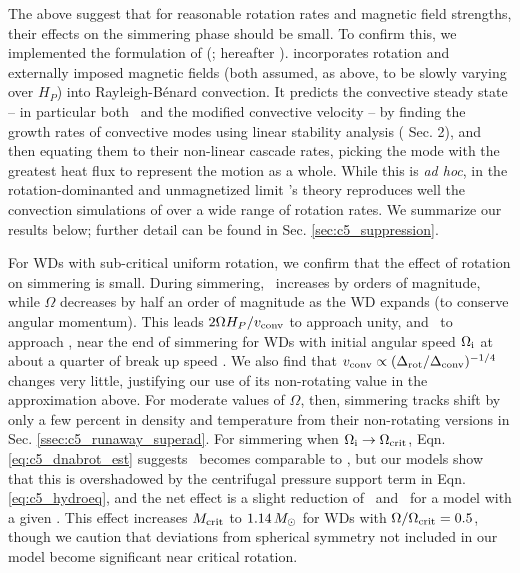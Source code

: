 The above suggest that for reasonable rotation rates and magnetic field strengths, their effects on the simmering phase should be small.  To confirm this, we implemented the formulation of \citeauthor{stev79} (\citeyear{stev79}; hereafter \citeal{stev79}).  \citeal{stev79} incorporates rotation and externally imposed magnetic fields (both assumed, as above, to be slowly varying over $H_P$) into Rayleigh-B\'{e}nard convection.  It predicts the convective steady state -- in particular both \deltanab\ and the modified convective velocity -- by finding the growth rates of convective modes using linear stability analysis (\citeal{stev79} Sec. 2), and then equating them to their non-linear cascade rates, picking the mode with the greatest heat flux to represent the motion as a whole.  While this is \textit{ad hoc}, in the rotation-dominanted and unmagnetized limit \citeal{stev79}'s theory reproduces well the convection simulations of \cite{barkdl14} over a wide range of rotation rates.  We summarize our results below; further detail can be found in Sec. \ref{sec:c5_suppression}.

For WDs with sub-critical uniform rotation, we confirm that the effect of rotation on simmering is small.  During simmering, \vconv\ increases by orders of magnitude, while $\Omega$ decreases by half an order of magnitude as the WD expands (to conserve angular momentum).  This leads $2\Omega H_P/\vconv$ to approach unity, and \dnabrot\ to approach \dnabconv, near the end of simmering for WDs with initial angular speed $\Ominit$ at about a quarter of break up speed \Omcrit.  We also find that $\vconv \propto (\dnabrot/\dnabconv)^{-1/4}$ changes very little, justifying our use of its non-rotating value in the approximation above. For moderate values of $\Omega$, then, simmering tracks shift by only a few percent in density and temperature from their non-rotating versions in Sec. \ref{ssec:c5_runaway_superad}.  For simmering when $\Ominit \rightarrow \Omcrit$, Eqn. \ref{eq:c5_dnabrot_est} suggests \dnabrot\ becomes comparable to \nablaad, but our models show that this is overshadowed by the centrifugal pressure support term in Eqn. \ref{eq:c5_hydroeq}, and the net effect is a slight reduction of \rhoc\ and \Tc\ for a model with a given \Sc.  This effect increases $\Mcrit$ to $1.14\,\Msun$ for WDs with $\Omega/\Omcrit = 0.5$, though we caution that deviations from spherical symmetry not included in our model become significant near critical rotation.


